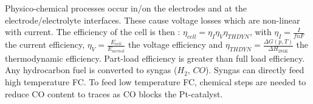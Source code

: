 \documentclass[../main.tex]{subfiles}
\begin{document}
Physico-chemical processes occur in/on the electrodes and at the electrode/electrolyte interfaces. These cause voltage losses which are non-linear with current. The efficiency of the cell is then : $\eta_{cell} = \eta_I \eta_V \eta_{THDYN}$, with $\eta_I = \frac{I}{fnF}$ the current efficiency, $\eta_{V} = \frac{E_{cell}}{E_{nernst}}$ the voltage efficiency and $\eta_{THDYN} = \frac{\Delta G(p,T)}{\Delta H_{293K}}$ the thermodynamic efficiency. Part-load efficiency is greater than full load efficiency. \\
Any hydrocarbon fuel is converted to syngas ($H_2$, $CO$). Syngas can directly feed high temperature FC. To feed low temperature FC, chemical steps are needed to reduce CO content to traces as CO blocks the Pt-catalyst. \\
\end{document}
